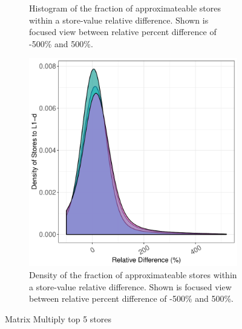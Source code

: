 \begin{figure}[htbp]
\begin{subfigure}{0.33\textwidth}
		\caption{Histogram of the fraction of approximateable stores within a store-value relative difference. Shown is focused view between relative percent difference of -500\% and 500\%.}
	\end{subfigure}
	\begin{subfigure}{0.33\textwidth}
		\centering
		\includegraphics[scale=0.4]{graphs/matrix_multiply_top5/narrow_dist.pdf}
		\caption{Density of the fraction of approximateable stores within a store-value relative difference. Shown is focused view between relative percent difference of -500\% and 500\%.}
	\end{subfigure}
\caption{Matrix Multiply top 5 stores} %
\label{fig:matrix_multiply_valsim_top5}
\end{figure}




